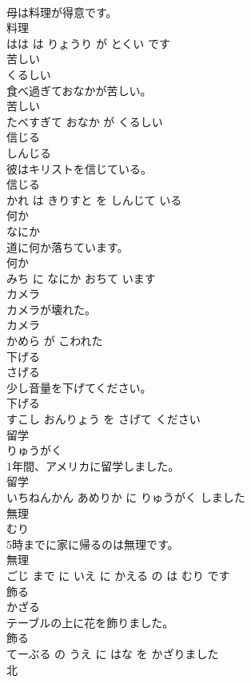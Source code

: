 \documentclass[8pt]{extreport}
\begin{document}
\begin{CJK}{UTF8}{min}
\\	母は料理が得意です。	
\\	料理 
\\	はは は りょうり が とくい です			
\\	苦しい	
\\	くるしい			
\\	食べ過ぎておなかが苦しい。	
\\	苦しい 
\\	たべすぎて おなか が くるしい			
\\	信じる	
\\	しんじる			
\\	彼はキリストを信じている。	
\\	信じる 
\\	かれ は きりすと を しんじて いる			
\\	何か	
\\	なにか			
\\	道に何か落ちています。	
\\	何か 
\\	みち に なにか おちて います			
\\	カメラ	
\\	カメラが壊れた。	
\\	カメラ 
\\	かめら が こわれた			
\\	下げる	
\\	さげる			
\\	少し音量を下げてください。	
\\	下げる 
\\	すこし おんりょう を さげて ください			
\\	留学	
\\	りゅうがく			
\\	1年間、アメリカに留学しました。	
\\	留学 
\\	いちねんかん あめりか に りゅうがく しました			
\\	無理	
\\	むり			
\\	5時までに家に帰るのは無理です。	
\\	無理 
\\	ごじ まで に いえ に かえる の は むり です			
\\	飾る	
\\	かざる			
\\	テーブルの上に花を飾りました。	
\\	飾る 
\\	てーぶる の うえ に はな を かざりました			
\\	北	

\end{CJK}
\end{document}
